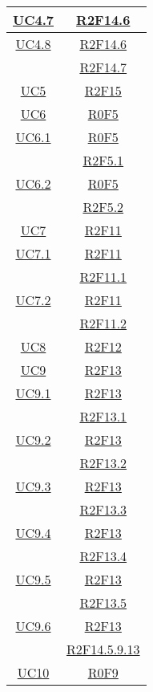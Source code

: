 \begin{longtable}{|c|c|}
\hline
\hyperlink{UC4.7}{UC4.7} & \hyperlink{R2F14.6}{R2F14.6}\\
\hline
\hyperlink{UC4.8}{UC4.8} & \hyperlink{R2F14.6}{R2F14.6}\\
& \hyperlink{R2F14.7}{R2F14.7}\\
\hline
\hyperlink{UC5}{UC5} & \hyperlink{R2F15}{R2F15}\\
\hline
\hyperlink{UC6}{UC6} & \hyperlink{R0F5}{R0F5}\\
\hline
\hyperlink{UC6.1}{UC6.1} & \hyperlink{R0F5}{R0F5}\\
& \hyperlink{R2F5.1}{R2F5.1}\\
\hline
\hyperlink{UC6.2}{UC6.2} & \hyperlink{R0F5}{R0F5}\\
& \hyperlink{R2F5.2}{R2F5.2}\\
\hline
\hyperlink{UC7}{UC7} & \hyperlink{R2F11}{R2F11}\\
\hline
\hyperlink{UC7.1}{UC7.1} & \hyperlink{R2F11}{R2F11}\\
& \hyperlink{R2F11.1}{R2F11.1}\\
\hline
\hyperlink{UC7.2}{UC7.2} & \hyperlink{R2F11}{R2F11}\\
& \hyperlink{R2F11.2}{R2F11.2}\\
\hline
\hyperlink{UC8}{UC8} & \hyperlink{R2F12}{R2F12}\\
\hline
\hyperlink{UC9}{UC9} & \hyperlink{R2F13}{R2F13}\\
\hline
\hyperlink{UC9.1}{UC9.1} & \hyperlink{R2F13}{R2F13}\\
& \hyperlink{R2F13.1}{R2F13.1}\\
\hline
\hyperlink{UC9.2}{UC9.2} & \hyperlink{R2F13}{R2F13}\\
& \hyperlink{R2F13.2}{R2F13.2}\\
\hline
\hyperlink{UC9.3}{UC9.3} & \hyperlink{R2F13}{R2F13}\\
& \hyperlink{R2F13.3}{R2F13.3}\\
\hline
\hyperlink{UC9.4}{UC9.4} & \hyperlink{R2F13}{R2F13}\\
& \hyperlink{R2F13.4}{R2F13.4}\\
\hline
\hyperlink{UC9.5}{UC9.5} & \hyperlink{R2F13}{R2F13}\\
& \hyperlink{R2F13.5}{R2F13.5}\\
\hline
\hyperlink{UC9.6}{UC9.6} & \hyperlink{R2F13}{R2F13}\\
& \hyperlink{R2F14.5.9.13}{R2F14.5.9.13}\\
\hline
\hyperlink{UC10}{UC10} & \hyperlink{R0F9}{R0F9}\\

\end{longtable}
